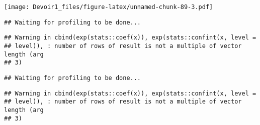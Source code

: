 \documentclass[]{article}
\newenvironment{Shaded}{\begin{snugshade}}{\end{snugshade}}
\newcommand{\KeywordTok}[1]{\textcolor[rgb]{0.13,0.29,0.53}{\textbf{#1}}}
\newcommand{\DataTypeTok}[1]{\textcolor[rgb]{0.13,0.29,0.53}{#1}}
\newcommand{\DecValTok}[1]{\textcolor[rgb]{0.00,0.00,0.81}{#1}}
\newcommand{\StringTok}[1]{\textcolor[rgb]{0.31,0.60,0.02}{#1}}
\newcommand{\OperatorTok}[1]{\textcolor[rgb]{0.81,0.36,0.00}{\textbf{#1}}}
\newcommand{\NormalTok}[1]{#1}
\begin{document}
\texttt{[image: Devoir1\_files/figure-latex/unnamed-chunk-89-3.pdf]}

\begin{Shaded}
\end{Shaded}

\begin{verbatim}
## Waiting for profiling to be done...
\end{verbatim}

\begin{verbatim}
## Warning in cbind(exp(stats::coef(x)), exp(stats::confint(x, level =
## level)), : number of rows of result is not a multiple of vector length (arg
## 3)
\end{verbatim}

\begin{verbatim}
## Waiting for profiling to be done...
\end{verbatim}

\begin{verbatim}
## Warning in cbind(exp(stats::coef(x)), exp(stats::confint(x, level =
## level)), : number of rows of result is not a multiple of vector length (arg
## 3)
\end{verbatim}
\end{document}
